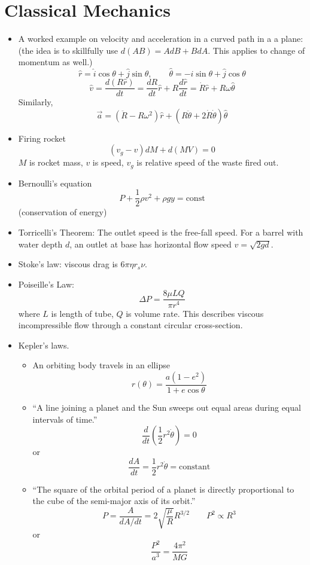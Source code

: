 \documentclass[12pt,a4paper]{book}
\begin{document}
\chapter{Classical Mechanics}




\begin{itemize}
\item A worked example on velocity and acceleration in a curved path in
a a plane: (the idea is to skillfully use $d(AB)=AdB+BdA$. This applies
to change of momentum as well.)\[
\hat{r}=\hat{i}\cos\theta+\hat{j}\sin\theta,\qquad\hat{\theta}=-\hat{i}\sin\theta+\hat{j}\cos\theta\]
\[
\hat{v}=\frac{d(R\hat{r})}{dt}=\frac{dR}{dt}\hat{r}+R\frac{d\hat{r}}{dt}=\dot{R}\hat{r}+R\omega\hat{\theta}\]
Similarly, \[
\vec{a}=(\ddot{R}-R\omega^{2})\hat{r}+(R\ddot{\theta}+2\dot{R}\dot{\theta})\hat{\theta}\]

\item Firing rocket\[
(v_{g}-v)dM+d(MV)=0\]
$M$ is rocket mass, $v$ is speed, $v_{g}$ is relative speed of
the waste fired out.
\item Bernoulli's equation\[
P+\frac{1}{2}\rho v^{2}+\rho gy=\text{const}\]
(conservation of energy)
\item Torricelli's Theorem: The outlet speed is the free-fall speed. For
a barrel with water depth $d$, an outlet at base has horizontal flow
speed $v=\sqrt{2gd}$.
\item Stoke's law: viscous drag is $6\pi\eta r_{s}\nu$.
\item Poiseille's Law:\[
\Delta P=\frac{8\mu LQ}{\pi r^{4}}\]
where $L$ is length of tube, $Q$ is volume rate. This describes
viscous incompressible flow through a constant circular cross-section.
\item Kepler's laws.

\begin{itemize}
\item An orbiting body travels in an ellipse\[
r(\theta)=\frac{a(1-e^{2})}{1+e\cos\theta}\]

\item {}``A line joining a planet and the Sun sweeps out equal areas during
equal intervals of time.''\[
\frac{d}{dt}\left(\frac{1}{2}r^{2}\dot{\theta}\right)=0\]
or\[
\frac{dA}{dt}=\frac{1}{2}r^{2}\dot{\theta}=\text{constant}\]

\item {}``The square of the orbital period of a planet is directly proportional
to the cube of the semi-major axis of its orbit.''\[
P=\frac{A}{dA/dt}=2\sqrt{\frac{\mu}{R}}R^{3/2}\qquad P^{2}\propto R^{3}\]
or \[
\frac{P^{2}}{a^{3}}=\frac{4\pi^{2}}{MG}\]


\end{itemize}
\end{itemize}
\end{document}

